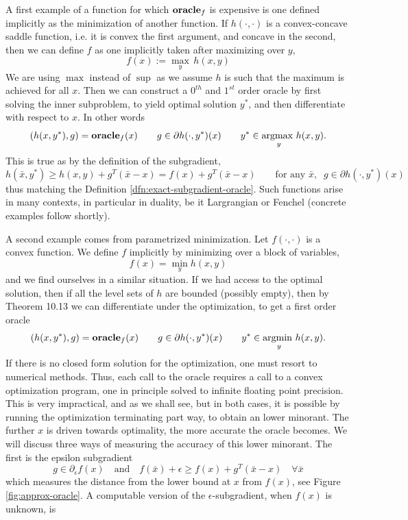 A first example of a function for which $\mbox{\bf oracle}_f$ is expensive  is one
defined implicitly as the minimization of another function. If $h(\cdot,
\cdot)$ is a convex-concave saddle function, i.e. it is convex the
first argument, and concave in the  second, then we can define $f$
as one implicitly taken after maximizing over $y$,
\begin{equation} \label{eq:saddle-f}
f(x) := \max_y \, h(x,y)
\end{equation}
We are using $\max$ instead of $\sup$ as we assume $h$ is such that 
the maximum is achieved for all $x$. Then we can construct a $0^{th}$ and $1^{st}$ order oracle by first solving the inner subproblem, to yield optimal solution $y^*$, and then differentiate with respect to $x$. In other words
\begin{equation}
(h(x,y^{*}),g)
    =\mbox{\bf oracle}_f(x)
      \qquad g \in \partial h(\cdot ,y^{*})(x)
      \qquad y^{*}\in\underset{y}{\mbox{argmax }}h(x,y).
\end{equation}
This is true as by the definition of the subgradient,
$$h(\bar{x},y^*) \geq h(x, y) + g^T(\bar{x} - x) = f(x) + g^T(\bar{x} - x) 
\qquad
\mbox{for any } \bar{x}, \;\; g \in \partial h(\cdot ,y^{*})(x) $$
thus matching the Definition \ref{dfn:exact-subgradient-oracle}. Such functions arise in many contexts, in particular in duality, be it
Largrangian or Fenchel (concrete examples follow shortly). 

A
second example comes from parametrized minimization. Let $f(\cdot, \cdot)$ is a
convex function. We define $f$ implicitly by minimizing over a block of variables,
\begin{equation}
f(x)=\min_{y}h(x,y)
\end{equation}
and we find ourselves in a similar situation. If we had access to the optimal solution,
then if all the level sets of $h$ are bounded (possibly empty), then by \cite{RTRW:1998} Theorem 10.13 we can differentiate under the optimization, to get a first order oracle
\begin{equation}
(h(x,y^{*}),g)
    =\mbox{\bf oracle}_f(x)
      \qquad g \in \partial h(\cdot ,y^{*})(x)
      \qquad y^{*}\in\underset{y}{\mbox{argmin }}h(x,y).
\end{equation}
If there is no closed form solution for the optimization, one must resort to
numerical methods. Thus, each call to the oracle requires a call to a convex
optimization program, one in principle solved to infinite floating  point
precision. This is very impractical, and as we shall see, but in both cases, it is
possible by running the optimization terminating part way, to obtain an lower 
minorant. The further $x$ is driven towards optimality, the more accurate the
oracle becomes. We will discuss three ways of measuring the accuracy of this lower
minorant. The first is the epsilon subgradient
$$
  g \in \partial_\epsilon f(x) \quad \text{and} \quad f(\bar{x}) + \epsilon \geq f(x)+{g}^T({\bar{x}-x}) \quad \forall \bar{x}
$$
which measures the distance from the lower bound at $x$ from $f(x)$, see
Figure \ref{fig:approx-oracle}. A computable version of the $\epsilon$-subgradient, 
when $f(x)$ is unknown, is

